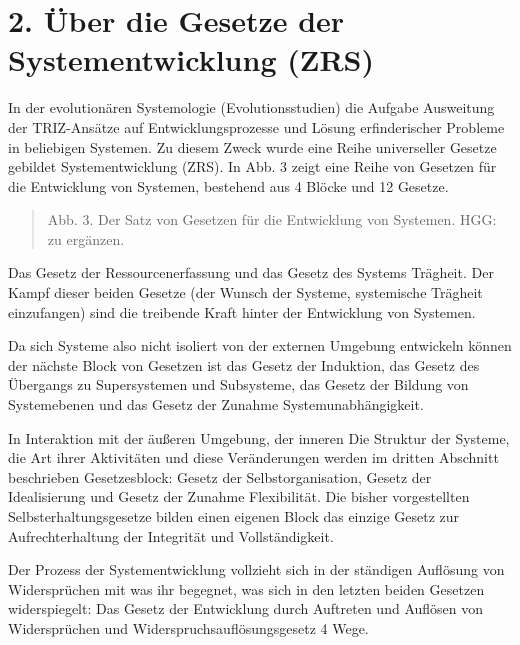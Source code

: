 \documentclass[11pt,a4paper]{article}
\begin{document}
\section*{2. Über die Gesetze der Systementwicklung (ZRS)}
In der evolutionären Systemologie (Evolutionsstudien) die Aufgabe Ausweitung
der TRIZ-Ansätze auf Entwicklungsprozesse und Lösung erfinderischer Probleme
in beliebigen Systemen. Zu diesem Zweck wurde eine Reihe universeller Gesetze
gebildet Systementwicklung (ZRS). In Abb. 3 zeigt eine Reihe von Gesetzen für
die Entwicklung von Systemen, bestehend aus 4 Blöcke und 12 Gesetze.
\begin{quote}
  Abb. 3. Der Satz von Gesetzen für die Entwicklung von Systemen. HGG: zu
  ergänzen. 
\end{quote}
Das Gesetz der Ressourcenerfassung und das Gesetz des Systems Trägheit. Der
Kampf dieser beiden Gesetze (der Wunsch der Systeme, systemische Trägheit
einzufangen) sind die treibende Kraft hinter der Entwicklung von Systemen.

Da sich Systeme also nicht isoliert von der externen Umgebung entwickeln
können der nächste Block von Gesetzen ist das Gesetz der Induktion, das Gesetz
des Übergangs zu Supersystemen und Subsysteme, das Gesetz der Bildung von
Systemebenen und das Gesetz der Zunahme Systemunabhängigkeit.

In Interaktion mit der äußeren Umgebung, der inneren Die Struktur der Systeme,
die Art ihrer Aktivitäten und diese Veränderungen werden im dritten Abschnitt
beschrieben Gesetzesblock: Gesetz der Selbstorganisation, Gesetz der
Idealisierung und Gesetz der Zunahme Flexibilität. Die bisher vorgestellten
Selbsterhaltungsgesetze bilden einen eigenen Block das einzige Gesetz zur
Aufrechterhaltung der Integrität und Vollständigkeit.

Der Prozess der Systementwicklung vollzieht sich in der ständigen Auflösung
von Widersprüchen mit was ihr begegnet, was sich in den letzten beiden
Gesetzen widerspiegelt: Das Gesetz der Entwicklung durch Auftreten und
Auflösen von Widersprüchen und Widerspruchsauflösungsgesetz 4 Wege.
\end{document}
